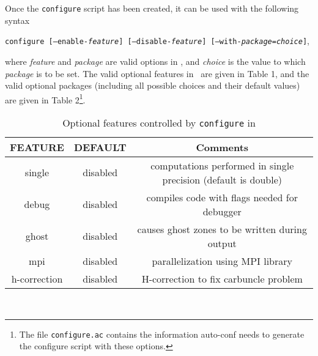 Once the {\tt configure} script has been created, it can be used
with the following
syntax
\begin{center}
{\tt configure [--enable-{\it feature}] [--disable-{\it feature}]
[--with-{\it package}={\it choice}]},
\end{center}
where {\it feature} and {\it package}
are valid options in \ath, and {\it choice} is the value to which
{\it package} is to be set.  The valid optional features in \ath\ are given in
Table 1, and the valid optional packages (including all possible choices and
their default values) are given in Table 2\footnote{The file {\tt configure.ac}
contains the information auto-conf needs to generate the configure script
with these options.}.

\begin{table}[ht]
\caption{Optional features controlled by {\tt configure} in \ath}
\begin{tabular}{|c|c|c|} \hline \hline
FEATURE & DEFAULT & Comments \\ \hline
single &  disabled & computations performed in single precision (default is double) \\
debug  & disabled & compiles code with flags needed for debugger \\
ghost  & disabled & causes ghost zones to be written during output \\
mpi    & disabled & parallelization using MPI library \\
h-correction & disabled & H-correction to fix carbuncle problem 
\\ \hline
\end{tabular}
\\
\end{table}

